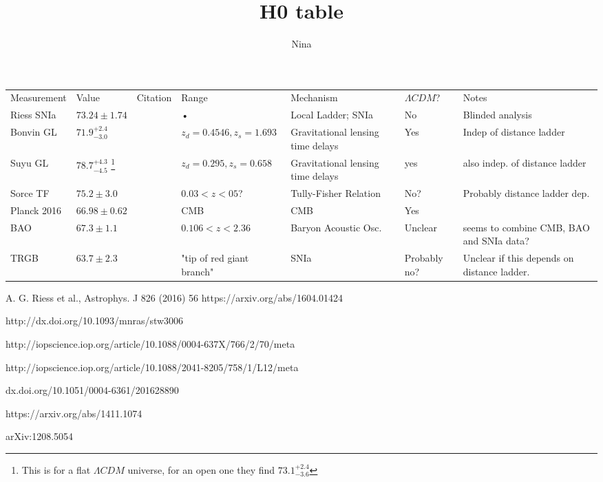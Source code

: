 \documentclass[10pt,a4paper]{article}
\author{Nina}
\title{H0 table}
\begin{document}
\begin{center}

\begin{tabular}{|l|l|l|l|l|l|l|}
Measurement & Value & Citation & Range & Mechanism &  $\Lambda CDM$? & Notes\\ 
Riess SNIa & $73.24 \pm 1.74$ & \cite{Riess16}& • & Local Ladder; SNIa & No & Blinded analysis\\ 
Bonvin GL & $71.9^{+2.4}_{-3.0}$ & \cite{BonvinGL} & $z_d = 0.4546,z_s=1.693$ & Gravitational lensing time delays & Yes & Indep of distance ladder \\ 
Suyu GL & $78.7^{+4.3}_{-4.5}$ \footnote{This is for a flat $\Lambda CDM$ universe, for an open one they find $73.1^{+2.4}_{-3.6}$} & \cite{SuyuGL} & $z_d=0.295,z_s=0.658$ & Gravitational lensing time delays & yes & also indep. of distance ladder \\
Sorce TF & $75.2 \pm 3.0$ &\cite{SorceTF} &$0.03<z<05$?& Tully-Fisher Relation & No? & Probably distance ladder dep.\\

Planck 2016 &$66.98\pm 0.62$ & \cite{Planck16} & CMB & CMB & Yes & \\
BAO & $67.3 \pm 1.1$ & \cite{BAO} & $0.106<z<2.36$ & Baryon Acoustic Osc. & Unclear & seems to combine CMB, BAO and SNIa data? \\
TRGB &  $63.7 \pm 2.3$ & \cite{TRGB}& "tip of red giant branch" & SNIa &Probably no? & Unclear if this depends on distance ladder.  
\end{tabular}
\end{center}
\begin{thebibliography}{10}
 A. G. Riess et al., Astrophys. J 826 (2016) 56 https://arxiv.org/abs/1604.01424

 http://dx.doi.org/10.1093/mnras/stw3006

 http://iopscience.iop.org/article/10.1088/0004-637X/766/2/70/meta

http://iopscience.iop.org/article/10.1088/2041-8205/758/1/L12/meta

dx.doi.org/10.1051/0004-6361/201628890

https://arxiv.org/abs/1411.1074

 	arXiv:1208.5054
\end{thebibliography}
\end{document}
